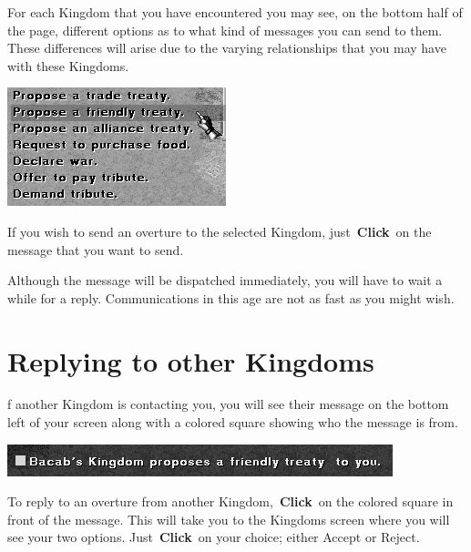 For each Kingdom that you have encountered you may see, on the bottom half of the page, different options as to what kind of messages you can send to them. These differences will arise due to the varying relationships that you may have with these Kingdoms.


\begin{center}
	\includegraphics[width=0.7\linewidth]{Idimplomacy_propose}
\end{center}

If you wish to send an overture to the selected Kingdom, just \textbf{Click} on the message that you want to send.

Although the message will be dispatched immediately, you will have to wait a while for a reply. Communications in this age are not as fast as you might wish.

\section{Replying to other Kingdoms}


f another Kingdom is contacting you, you will see their message on the bottom left of your screen along with a colored square showing who the message is from.

\begin{center}
	\includegraphics[width=0.7\linewidth]{Imessage}
\end{center}

To reply to an overture from another Kingdom, \textbf{Click} on the colored square in front of the message. This will take you to the Kingdoms screen where you will see your two options. Just \textbf{Click} on your choice; either Accept or Reject.

